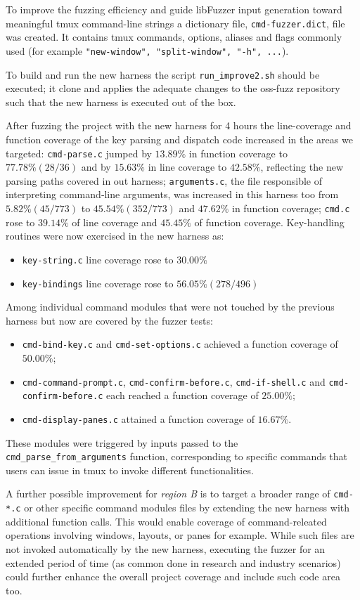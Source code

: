 To improve the fuzzing efficiency and guide libFuzzer input generation toward meaningful tmux command-line strings a dictionary file, \texttt{cmd-fuzzer.dict}, file was created. It contains tmux commands, options, aliases and flags commonly used (for example \texttt{"new-window", "split-window", "-h", ...}).

To build and run the new harness the script \texttt{run\_improve2.sh} should be executed; it clone and applies the adequate changes to the oss-fuzz repository such that the new harness is executed out of the box.

After fuzzing the project with the new harness for 4 hours the line-coverage and function coverage of the key parsing and dispatch code increased in the areas we targeted: \texttt{cmd-parse.c} jumped by $13.89\%$ in function coverage to $77.78 \% (28/36)$ and by $15.63\%$ in line coverage to $42.58\%$, reflecting the new parsing paths covered in out harness; \texttt{arguments.c}, the file responsible of interpreting command‐line arguments, was increased in this harness too from $5.82\% (45/773)$ to $45.54 \% (352/773)$ and $47.62 \%$ in function coverage; \texttt{cmd.c} rose to $39.14 \%$ of line coverage and $45.45\%$ of function coverage.
Key-handling routines were now exercised in the new harness as:
\begin{itemize}
    \item \texttt{key-string.c} line coverage rose to $30.00\%$
    \item \texttt{key-bindings} line coverage rose to $56.05\% (278/496)$
\end{itemize}

Among individual command modules that were not touched by the previous harness but now are covered by the fuzzer tests:
\begin{itemize}
    \item \texttt{cmd-bind-key.c} and \texttt{cmd-set-options.c} achieved a function coverage of $50.00\%$;
    \item \texttt{cmd-command-prompt.c}, \texttt{cmd-confirm-before.c}, \texttt{cmd-if-shell.c} and \texttt{cmd-confirm-before.c} each reached a function coverage of $25.00\%$;
    \item \texttt{cmd-display-panes.c} attained a function coverage of $16.67\%$.
\end{itemize}
These modules were triggered by inputs passed to the \texttt{cmd\_parse\_from\_arguments} function, corresponding to specific commands that users can issue in tmux to invoke different functionalities.

A further possible improvement for \textit{region B} is to target a broader range of \texttt{cmd-*.c} or other specific command modules files by extending the new harness with additional function calls. This would enable coverage of command-releated operations involving windows, layouts, or panes for example. While such files are not invoked automatically by the new harness, executing the fuzzer for an extended period of time (as common done in research and industry scenarios) could further enhance the overall project coverage and include such code area too.
